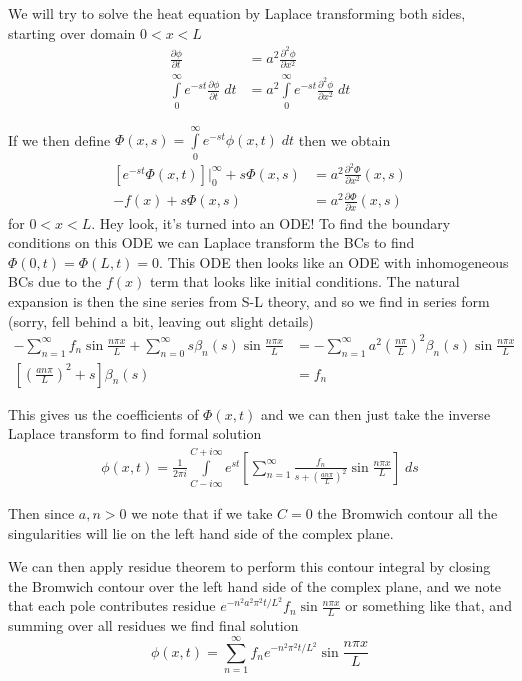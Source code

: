 \documentclass[10pt]{report}
\newcommand{\ptd}[2]{\frac{\partial^2 #1}{\partial#2^2}}
\newcommand{\pd}[2]{\frac{\partial #1}{\partial#2}}
\begin{document}
We will try to solve the heat equation by Laplace transforming both sides, starting over domain $0 < x < L$
\begin{align}
    \pd{\phi}{t} &= a^2 \ptd{\phi}{x}\\
    \int\limits_{0}^{\infty}e^{-st}\pd{\phi}{t}\;dt &= a^2\int\limits_{0}^{\infty}e^{-st}\ptd{\phi}{x}\;dt
\end{align}

If we then define $\Phi(x,s) = \int\limits_{0}^{\infty}e^{-st}\phi(x,t)\;dt$ then we obtain
\begin{align}
    \left[ e^{-st}\Phi(x,t) \right]\Big|_0^{\infty} + s\Phi(x,s) &= a^2\ptd{\Phi}{x}(x,s)\\
    -f(x) + s\Phi(x,s) &= a^2 \pd{\Phi}{x}(x,s)
\end{align}
for $0 < x < L$. Hey look, it's turned into an ODE! To find the boundary conditions on this ODE we can Laplace transform the BCs to find $\Phi(0,t) = \Phi(L,t) = 0$. This ODE then looks like an ODE with inhomogeneous BCs due to the $f(x)$ term that looks like initial conditions. The natural expansion is then the sine series from S-L theory, and so we find in series form (sorry, fell behind a bit, leaving out slight details)
\begin{align}
    -\sum_{n=1}^{\infty}f_n\sin\frac{n\pi x}{L} + \sum_{n=0}^{\infty}s\beta_n(s) \sin \frac{n\pi x}{L} &= -\sum_{n=1}^{\infty}a^2 \left( \frac{n\pi}{L} \right)^2 \beta_n(s)\sin \frac{n\pi x}{L}\\
    \left[ \left( \frac{an\pi}{L} \right)^2 + s \right]\beta_n(s) &= f_n
\end{align}

This gives us the coefficients of $\Phi(x,t)$ and we can then just take the inverse Laplace transform to find formal solution
\begin{align}
    \phi(x,t) = \frac{1}{2\pi i}\int\limits_{C - i\infty}^{C + i\infty}e^{st}\left[ \sum_{n=1}^{\infty}\frac{f_n}{s + \left( \frac{an\pi}{L} \right)^2}\sin \frac{n\pi x}{L} \right]\;ds
\end{align}

Then since $a,n > 0$ we note that if we take $C=0$ the Bromwich contour all the singularities will lie on the left hand side of the complex plane.

We can then apply residue theorem to perform this contour integral by closing the Bromwich contour over the left hand side of the complex plane, and we note that each pole contributes residue $e^{-n^2a^2\pi^2t/L^2}f_n\sin \frac{n\pi x}{L}$ or something like that, and summing over all residues we find final solution
\begin{equation}
    \phi(x,t) = \sum_{n=1}^{\infty}f_ne^{-n^2\pi^2t/L^2}\sin \frac{n\pi x}{L}\label{5.5.sepvar}
\end{equation}
\end{document}
